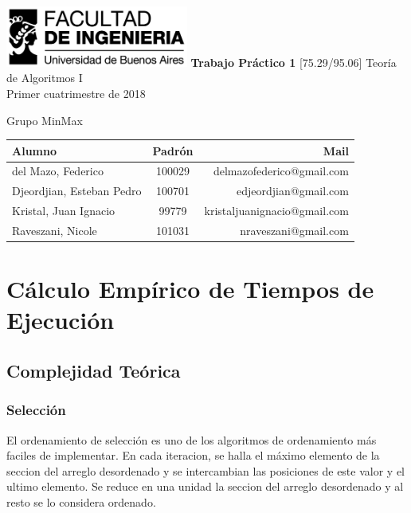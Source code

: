 \documentclass[article,a4paper]{article}
\begin{document}
\begin{titlepage}
	\hfill\includegraphics[width=6cm]{fiuba.jpg}
    \centering
    \vfill
    \Huge \textbf{Trabajo Práctico 1}
    \vskip2cm
    \Large [75.29/95.06] Teoría de Algoritmos I\\
    Primer cuatrimestre de 2018
    \vfill
    \begin{flushleft}
    Grupo MinMax
    \end{flushleft}
    \begin{tabular}{|l|c|r|}
	\hline
	Alumno & Padrón & Mail\\
	\hline
	\hline
	del Mazo, Federico & 100029 & delmazofederico@gmail.com\\
	\hline
    Djeordjian, Esteban Pedro & 100701 & edjeordjian@gmail.com\\	
	\hline
	Kristal, Juan Ignacio & 99779 & kristaljuanignacio@gmail.com\\
	\hline
    Raveszani, Nicole & 101031 & nraveszani@gmail.com\\
	\hline
	\end{tabular}
    \vfill
    \vfill
\end{titlepage}

\tableofcontents
\newpage
{}
\setcounter{page}{1}

\section{Cálculo Empírico de Tiempos de Ejecución}
\subsection{Complejidad Teórica}
\subsubsection{Selección}

El ordenamiento de selección es uno de los algoritmos de ordenamiento más faciles de implementar. En cada iteracion, se halla el máximo elemento de la seccion del arreglo desordenado y se intercambian las posiciones de este valor y el ultimo elemento. Se reduce en una unidad la seccion del arreglo desordenado y al resto se lo considera ordenado.
\end{document}
